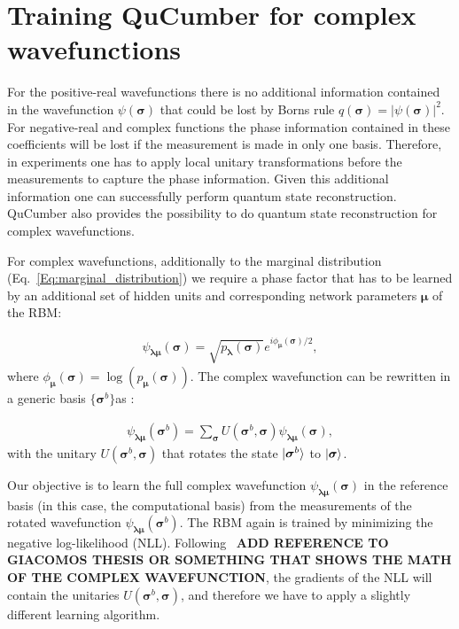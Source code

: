 \documentclass[submission, Phys]{SciPost}
\begin{document}
\section{Training QuCumber for complex wavefunctions}
\label{Sec:Training_QuCumber_on_complex_wavefunctions}

For the positive-real wavefunctions there is no additional information contained in the wavefunction
$\psi( \boldsymbol{\sigma})$ that could be lost by Borns rule $q(\boldsymbol{\sigma}) = | \psi( \boldsymbol{\sigma} ) |^2$.
For negative-real and complex functions the phase information contained in these coefficients will be lost if the measurement
is made in only one basis. Therefore, in experiments one has to apply local unitary transformations before the measurements
to capture the phase information. Given this additional information one can successfully perform quantum state reconstruction.
QuCumber also provides the possibility to do quantum state reconstruction for complex wavefunctions.

For complex wavefunctions, additionally to the marginal distribution (Eq.~\ref{Eq:marginal_distribution}) we require a phase factor
that has to be learned by an additional set of hidden units and corresponding network parameters $\bm{\mu}$ of the RBM:

\begin{align}
	\psi_{\bm{\lambda} \bm{\mu}} (\bm{\sigma})= \sqrt{p_{\bm{\lambda}} (\bm{\sigma})} e^{i \phi_{\bm{\mu}} (\bm{\sigma})/2},
\end{align}
%
where $\phi_{\bm{\mu}}(\bm{\sigma}) = \log (p_{\bm{\mu}} (\bm{\sigma}))$. The complex wavefunction can be rewritten in a generic basis $\{ \bm{\sigma}^b \}$as :

\begin{align}
	\psi_{\bm{\lambda} \bm{\mu}} (\bm{\sigma}^b)= \sum_{\bm{\sigma}} U (\bm{\sigma}^b, \bm{\sigma}) \psi_{\bm{\lambda} \bm{\mu}} (\bm{\sigma}),
\end{align}
%
with the unitary $U (\bm{\sigma}^b, \bm{\sigma})$ that rotates the state $\ket{\bm{\sigma}^b}$ to $\ket{\bm{\sigma}}$.

Our objective is to learn the full complex wavefunction $\psi_{\bm{\lambda} \bm{\mu}} (\bm{\sigma})$ in the reference basis (in this case, the computational basis) from the measurements of the rotated wavefunction $\psi_{\bm{\lambda} \bm{\mu}} (\bm{\sigma}^b)$.
The RBM again is trained by minimizing the negative log-likelihood (NLL). Following~\cite{} \textbf{ADD REFERENCE TO GIACOMOS THESIS OR SOMETHING THAT SHOWS THE MATH OF THE COMPLEX WAVEFUNCTION}, the gradients of the NLL will contain the unitaries $U (\bm{\sigma}^b, \bm{\sigma})$, and therefore we have to apply a slightly different learning algorithm.
\end{document}
